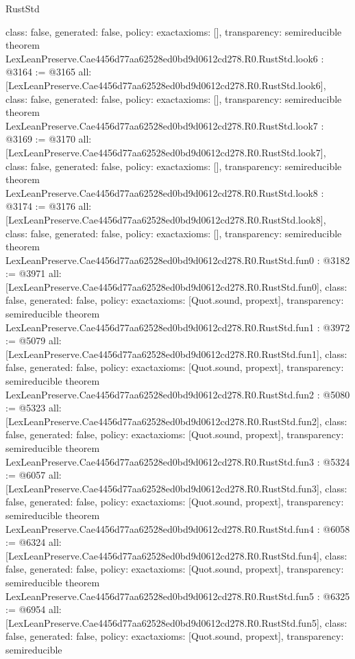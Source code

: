 \begin{lexlean}{RustStd}
\begin{coremodule}
{  class: false,
  generated: false,
  policy: exact{axioms: []},
  transparency: semireducible
}
theorem LexLeanPreserve.Cae4456d77aa62528ed0bd9d0612cd278.R0.RustStd.look6 : @3164 := @3165 {
  all: [LexLeanPreserve.Cae4456d77aa62528ed0bd9d0612cd278.R0.RustStd.look6],
  class: false,
  generated: false,
  policy: exact{axioms: []},
  transparency: semireducible
}
theorem LexLeanPreserve.Cae4456d77aa62528ed0bd9d0612cd278.R0.RustStd.look7 : @3169 := @3170 {
  all: [LexLeanPreserve.Cae4456d77aa62528ed0bd9d0612cd278.R0.RustStd.look7],
  class: false,
  generated: false,
  policy: exact{axioms: []},
  transparency: semireducible
}
theorem LexLeanPreserve.Cae4456d77aa62528ed0bd9d0612cd278.R0.RustStd.look8 : @3174 := @3176 {
  all: [LexLeanPreserve.Cae4456d77aa62528ed0bd9d0612cd278.R0.RustStd.look8],
  class: false,
  generated: false,
  policy: exact{axioms: []},
  transparency: semireducible
}
theorem LexLeanPreserve.Cae4456d77aa62528ed0bd9d0612cd278.R0.RustStd.fun0 : @3182 := @3971 {
  all: [LexLeanPreserve.Cae4456d77aa62528ed0bd9d0612cd278.R0.RustStd.fun0],
  class: false,
  generated: false,
  policy: exact{axioms: [Quot.sound, propext]},
  transparency: semireducible
}
theorem LexLeanPreserve.Cae4456d77aa62528ed0bd9d0612cd278.R0.RustStd.fun1 : @3972 := @5079 {
  all: [LexLeanPreserve.Cae4456d77aa62528ed0bd9d0612cd278.R0.RustStd.fun1],
  class: false,
  generated: false,
  policy: exact{axioms: [Quot.sound, propext]},
  transparency: semireducible
}
theorem LexLeanPreserve.Cae4456d77aa62528ed0bd9d0612cd278.R0.RustStd.fun2 : @5080 := @5323 {
  all: [LexLeanPreserve.Cae4456d77aa62528ed0bd9d0612cd278.R0.RustStd.fun2],
  class: false,
  generated: false,
  policy: exact{axioms: [Quot.sound, propext]},
  transparency: semireducible
}
theorem LexLeanPreserve.Cae4456d77aa62528ed0bd9d0612cd278.R0.RustStd.fun3 : @5324 := @6057 {
  all: [LexLeanPreserve.Cae4456d77aa62528ed0bd9d0612cd278.R0.RustStd.fun3],
  class: false,
  generated: false,
  policy: exact{axioms: [Quot.sound, propext]},
  transparency: semireducible
}
theorem LexLeanPreserve.Cae4456d77aa62528ed0bd9d0612cd278.R0.RustStd.fun4 : @6058 := @6324 {
  all: [LexLeanPreserve.Cae4456d77aa62528ed0bd9d0612cd278.R0.RustStd.fun4],
  class: false,
  generated: false,
  policy: exact{axioms: [Quot.sound, propext]},
  transparency: semireducible
}
theorem LexLeanPreserve.Cae4456d77aa62528ed0bd9d0612cd278.R0.RustStd.fun5 : @6325 := @6954 {
  all: [LexLeanPreserve.Cae4456d77aa62528ed0bd9d0612cd278.R0.RustStd.fun5],
  class: false,
  generated: false,
  policy: exact{axioms: [Quot.sound, propext]},
  transparency: semireducible
}
\end{coremodule}
\end{lexlean}

